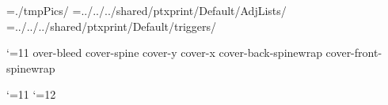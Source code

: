 \def\RHoddleft{\empty}
\def\RHoddcenter{\pagenumber}
\def\RHoddright{\rangeref}

\def\RHnoVevenleft{\empty}
\def\RHnoVevencenter{\pagenumber}
\def\RHnoVevenright{\empty}

\def\RHnoVoddleft{\empty}
\def\RHnoVoddcenter{\pagenumber}
\def\RHnoVoddright{\empty}

\VerseRefsfalse               %
\OmitChapterNumberRHfalse   %
\OmitBookReffalse              %

\def\RFoddcenter{\empty}
\def\RFevencenter{\empty}
\def\RFtitleevencenter{\pagenumberR}
\def\RFtitleoddcenter{\pagenumberR}
\def\RFnoVoddcenter{\empty}
\def\RFnoVevencenter{\empty}

\PBOnBodyfalse


\IncludeFiguresfalse
\SkipMissingFigtrue
\DoCaptionstrue
\FigurePlaceholdersfalse
\PicPath={./tmpPics/}
\AdjListPath={../../../shared/ptxprint/Default/AdjLists/}
\TrigListPath={../../../shared/ptxprint/Default/triggers/}
\NoTransparencytrue

\catcode`\@=11
\def\tmp{0mm}   %
\expandafter\edef\csname cover-bleed\endcsname{0mm}   %
\expandafter\edef\csname cover-spine\endcsname{-0.1mm}   %
\expandafter\xdef\csname cover-y\endcsname{\the\PaperHeight} %
\expandafter\xdef\csname cover-x\endcsname{\the\PaperWidth} %
\expandafter\edef\csname cover-back-spinewrap\endcsname{0mm} %
\expandafter\edef\csname cover-front-spinewrap\endcsname{0mm} %

\def\b{\the\p@rstylehooks \par\bgroup\s@tbaseline{b}\vskip\baselineskip\egroup}
\newlanguage\langund \language\langund
\catcode`\@=11
 
\catcode`\@=12
\let\pb=\pagebreak

